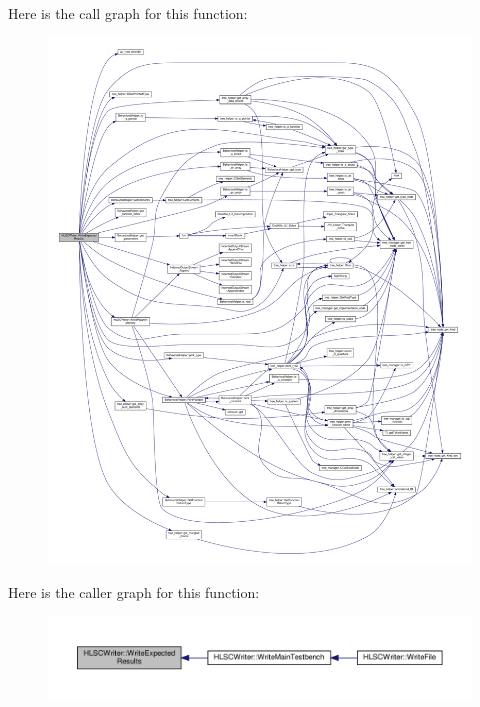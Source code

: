 Here is the call graph for this function\+:
\nopagebreak
\begin{figure}[H]
\begin{center}
\leavevmode
\includegraphics[width=350pt]{d4/db1/classHLSCWriter_acc0cead1cb01ad8d36eb6a6ead0e034a_cgraph}
\end{center}
\end{figure}
Here is the caller graph for this function\+:
\nopagebreak
\begin{figure}[H]
\begin{center}
\leavevmode
\includegraphics[width=350pt]{d4/db1/classHLSCWriter_acc0cead1cb01ad8d36eb6a6ead0e034a_icgraph}
\end{center}
\end{figure}
\mbox{\label{classHLSCWriter_a3b1718b9bd4cf44bf5c9e73af2b25986}} 
